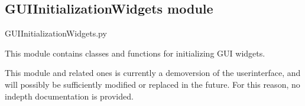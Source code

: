 \documentclass[letterpaper,10pt,english]{sphinxmanual}
\begin{document}
\sphinxstepscope


\subsection{GUIInitializationWidgets module}
\label{\detokenize{source/GUIInitializationWidgets:module-GUIInitializationWidgets}}\label{\detokenize{source/GUIInitializationWidgets:guiinitializationwidgets-module}}\label{\detokenize{source/GUIInitializationWidgets::doc}}
\sphinxAtStartPar
GUIInitializationWidgets.py

\sphinxAtStartPar
This module contains classes and functions for initializing GUI widgets.

\sphinxAtStartPar
This module and related ones is currently a demo\sphinxhyphen{}version of the user\sphinxhyphen{}interface, and will
possibly be sufficiently modified or replaced in the future. For this reason, no in\sphinxhyphen{}depth
documentation is provided.

\end{document}
